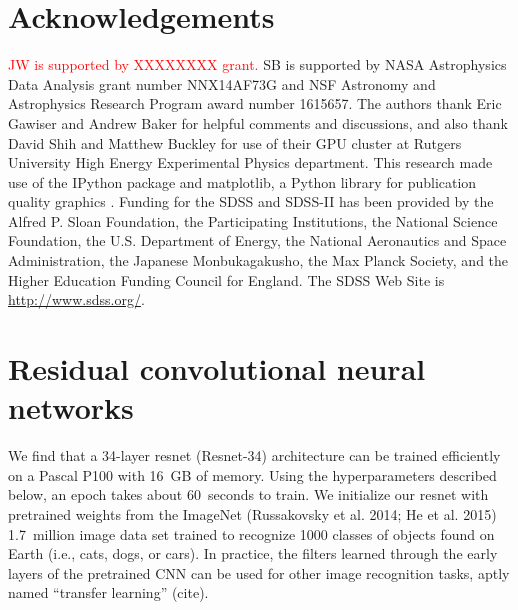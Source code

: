 \documentclass[fleqn,usenatbib]{mnras}
\newcommand{\editorial}[1]{\textcolor{red}{#1}}
\begin{document}
\section*{Acknowledgements}
\editorial{JW is supported by XXXXXXXX grant.}
SB is supported by NASA Astrophysics Data Analysis grant number NNX14AF73G and NSF Astronomy and Astrophysics Research Program award number 1615657.
The authors thank Eric Gawiser and Andrew Baker for helpful comments and discussions, and also thank David Shih and Matthew Buckley for use of their GPU cluster at Rutgers University High Energy Experimental Physics department. %
This research made use of the {\sc IPython} package \citep{Perez2007} and {\sc matplotlib}, a Python library for publication quality graphics \citep{Hunter2007}. Funding for the SDSS and SDSS-II has been provided by the Alfred P. Sloan Foundation, the Participating Institutions, the National Science Foundation, the U.S. Department of Energy, the National Aeronautics and Space Administration, the Japanese Monbukagakusho, the Max Planck Society, and the Higher Education Funding Council for England. The SDSS Web Site is \url{http://www.sdss.org/}.



\appendix
%
\section{Residual convolutional neural networks}
%



We find that a 34-layer resnet (Resnet-34) architecture can be trained efficiently on a Pascal P100 with 16~GB of memory.
Using the hyperparameters described below, an epoch takes about 60~seconds to train.
We initialize our resnet with pretrained weights from the ImageNet (Russakovsky et al. 2014; He et al. 2015) 1.7~million image data set trained to recognize 1000 classes of objects found on Earth (i.e., cats, dogs, or cars).
In practice, the filters learned through the early layers of the pretrained CNN can be used for other image recognition tasks, aptly named ``transfer learning'' (cite).
\end{document}
